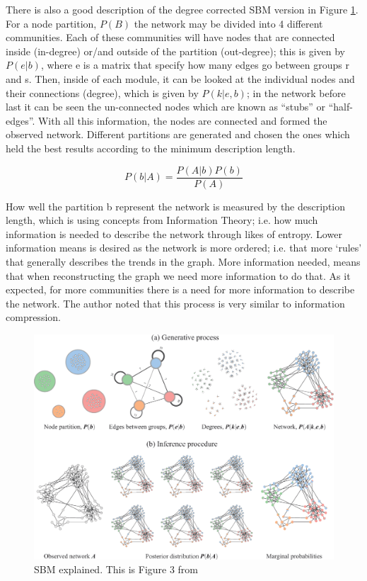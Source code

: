There is also a good description of the degree corrected SBM version in Figure \ref{fig:N_I:dc-sbm_explained}. For a node partition, $P(B)$ the network may be divided into 4 different communities. Each of these communities will have nodes that are connected inside (in-degree) or/and outside of the partition (out-degree); this is given by $P(e|b)$, where e is a matrix that specify how many edges go between groups r and s. Then, inside of each module, it can be looked at the individual nodes and their connections (degree), which is given by $ P(k|e,b)$; in the network before last it can be seen the un-connected nodes which are known as “stubs” or “half-edges”. With all this information, the nodes are connected and formed the observed network. Different partitions are generated and chosen the ones which held the best results according to the minimum description length.

\begin{equation} \label{eq:sbm}
         P(b|A) = \frac{P(A|b)P(b)}{P(A)}
\end{equation}



How well the partition b represent the network is measured by the description length, which is using concepts from Information Theory; i.e. how much information is needed to describe the network through likes of entropy. Lower information means is desired as the network is more ordered; i.e. that more ‘rules’ that generally describes the trends in the graph. More information needed, means that  when reconstructing the graph we need more information to do that. As it expected, for more communities there is a need for more information to describe the network. The author noted that this process is very similar to information compression.


\begin{figure}[!htb]    
    \centering
    \includegraphics[width=1.0\textwidth,height=1.0\textheight,keepaspectratio]{Sections/Network_I/Resources/dc-sbm_explained.png}
    \caption{SBM explained. This is Figure 3 from \citet{Peixoto2021-jx}}
    \label{fig:N_I:dc-sbm_explained}
\end{figure}
